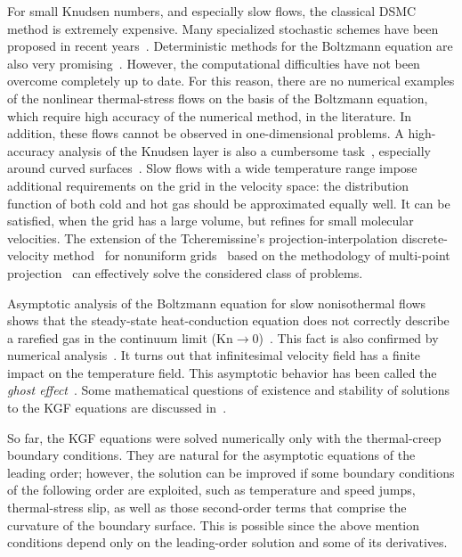 \documentclass[10pt]{article}
\newcommand{\Kn}{\mathrm{Kn}}
\begin{document}
For small Knudsen numbers, and especially slow flows, the classical DSMC method is extremely expensive.
Many specialized stochastic schemes have been proposed in recent years~\cite{Wagner2005, Hadji2013}.
Deterministic methods for the Boltzmann equation are also very promising~\cite{Dimarco2014, Mieussens2014}.
However, the computational difficulties have not been overcome completely up to date.
For this reason, there are no numerical examples of the nonlinear thermal-stress flows
on the basis of the Boltzmann equation, which require high accuracy of the numerical method, in the literature.
In addition, these flows cannot be observed in one-dimensional problems.
A high-accuracy analysis of the Knudsen layer is also a cumbersome task~\cite{Takata2015second},
especially around curved surfaces~\cite{Takata2015curvature}.
Slow flows with a wide temperature range impose additional requirements on the grid in the velocity space:
the distribution function of both cold and hot gas should be approximated equally well.
It can be satisfied, when the grid has a large volume, but refines for small molecular velocities.
The extension of the Tcheremissine's projection-interpolation discrete-velocity
method~\cite{Tcheremissine1997, Tcheremissine2000, Tcheremissine1998, Tcheremissine2006}
for nonuniform grids~\cite{Rogozin2016} based on the methodology of multi-point projection~\cite{Dodulad2012}
can effectively solve the considered class of problems.

Asymptotic analysis of the Boltzmann equation for slow nonisothermal flows shows
that the steady-state heat-conduction equation does not correctly describe a rarefied gas
in the continuum limit (\(\Kn\to0\))~\cite{Bobylev1995}.
This fact is also confirmed by numerical analysis~\cite{Sone1996}.
It turns out that infinitesimal velocity field has a finite impact on the temperature field.
This asymptotic behavior has been called the \emph{ghost effect}~\cite{Sone2002, Sone2007}.
Some mathematical questions of existence and stability of solutions to the KGF equations
are discussed in~\cite{Levermore2012, Tan2016}.

So far, the KGF equations were solved numerically only with the thermal-creep boundary conditions.
They are natural for the asymptotic equations of the leading order; however,
the solution can be improved if some boundary conditions of the following order are exploited,
such as temperature and speed jumps, thermal-stress slip, as well as those second-order terms
that comprise the curvature of the boundary surface.
This is possible since the above mention conditions depend only on the leading-order solution and some of its derivatives.
\end{document}
